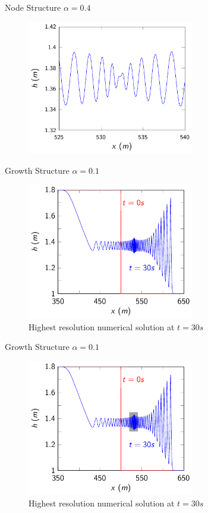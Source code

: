 \documentclass[pdf]{beamer}
\begin{document}
\begin{frame}{Node Structure $\alpha = 0.4$}
	\begin{figure}
		\includegraphics[width=0.65\textwidth]{./Pictures/Results/Example/nodez.pdf}
	\end{figure}
\end{frame}


\begin{frame}{Growth Structure $\alpha = 0.1$}
	\begin{figure}
		\includegraphics[width=0.65\textwidth]{./Pictures/Results/Example/growth.pdf}
		\caption{Highest resolution numerical solution at $t=30s$}
	\end{figure}
\end{frame}

\begin{frame}{Growth Structure $\alpha = 0.1$}
	\begin{figure}
		\includegraphics[width=0.65\textwidth]{./Pictures/Results/Example/growth1.pdf}
		\caption{Highest resolution numerical solution at $t=30s$}
	\end{figure}
\end{frame}
\end{document}
